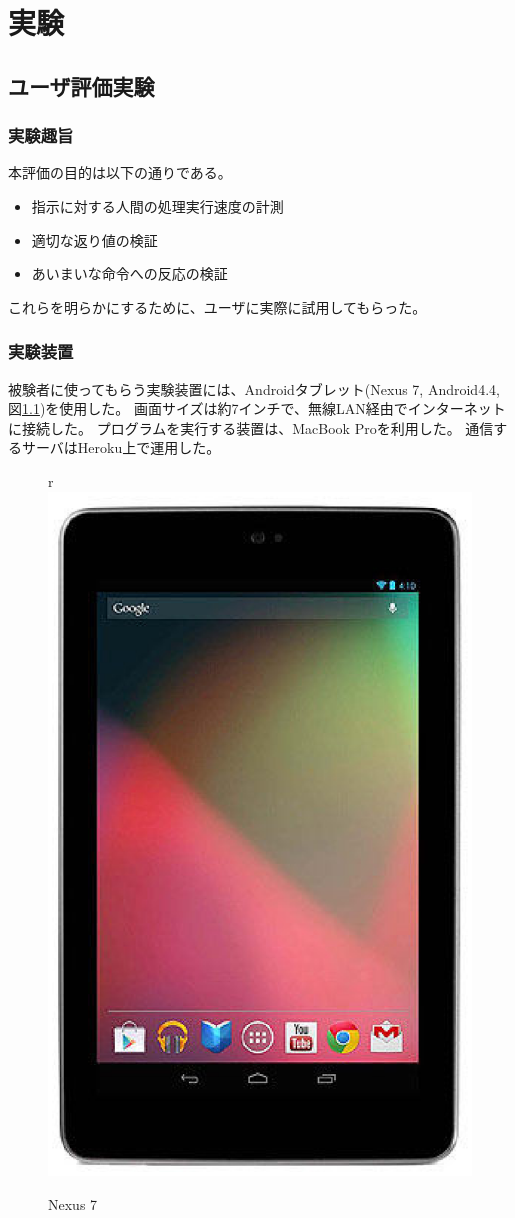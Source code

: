 \chapter{実験}\label{chap:evaluation}

\section{ユーザ評価実験}\label{sec:user-evaluation}

\subsection{実験趣旨}\label{ux5b9fux9a13ux8da3ux65e8}

本評価の目的は以下の通りである。

\begin{itemize}
\itemsep1pt\parskip0pt
\item
  指示に対する人間の処理実行速度の計測
\item
  適切な返り値の検証
\item
  あいまいな命令への反応の検証
\end{itemize}

これらを明らかにするために、ユーザに実際に試用してもらった。

\subsection{実験装置}\label{ux5b9fux9a13ux88c5ux7f6e}

被験者に使ってもらう実験装置には、Androidタブレット(Nexus 7, Android4.4,
図\ref{fig:nexus7})を使用した。
画面サイズは約7インチで、無線LAN経由でインターネットに接続した。
プログラムを実行する装置は、MacBook Proを利用した。
通信するサーバはHeroku上で運用した。

\begin{figure}[htbp]
  \begin{center}r
  \includegraphics[width=.5\linewidth]{images/nexus7.eps}
  \end{center}
  \caption{Nexus 7}
  \label{fig:nexus7}
\end{figure}

